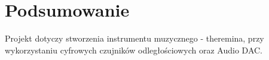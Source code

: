 \documentclass[10pt, a4paper]{article}
\begin{document}
\section{Podsumowanie}
Projekt dotyczy stworzenia instrumentu muzycznego - theremina, przy wykorzystaniu cyfrowych czujników odległościowych oraz Audio DAC.

\newpage
{}


\end{document}
